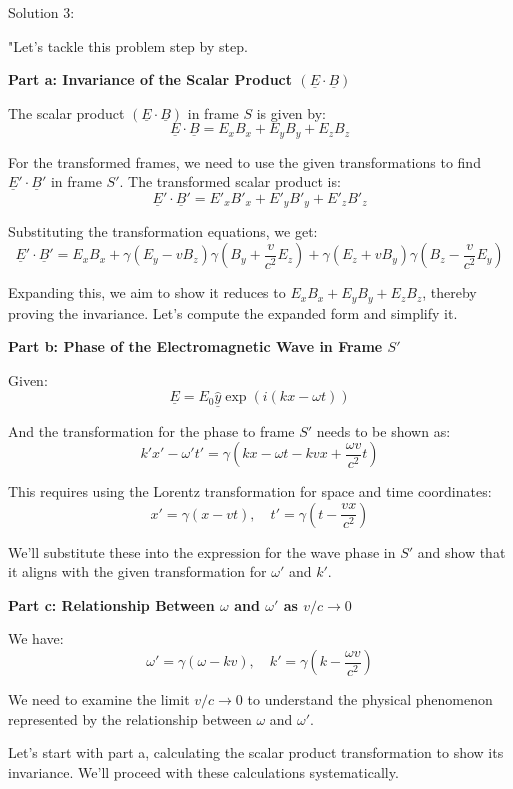 Solution 3:

"Let's tackle this problem step by step.

\textbf{Part a: Invariance of the Scalar Product \( (\underline{E} \cdot \underline{B}) \)}

The scalar product \( (\underline{E} \cdot \underline{B}) \) in frame \( S \) is given by:
\[
\underline{E} \cdot \underline{B} = E_{x}B_{x} + E_{y}B_{y} + E_{z}B_{z}
\]

For the transformed frames, we need to use the given transformations to find \( \underline{E}' \cdot \underline{B}' \) in frame \( S' \). The transformed scalar product is:
\[
\underline{E}' \cdot \underline{B}' = E'_{x}B'_{x} + E'_{y}B'_{y} + E'_{z}B'_{z}
\]

Substituting the transformation equations, we get:
\[
\underline{E}' \cdot \underline{B}' = E_{x}B_{x} + \gamma(E_{y} - vB_{z})\gamma(B_{y} + \frac{v}{c^{2}}E_{z}) + \gamma(E_{z} + vB_{y})\gamma(B_{z} - \frac{v}{c^{2}}E_{y})
\]

Expanding this, we aim to show it reduces to \( E_{x}B_{x} + E_{y}B_{y} + E_{z}B_{z} \), thereby proving the invariance. Let's compute the expanded form and simplify it.

\textbf{Part b: Phase of the Electromagnetic Wave in Frame \( S' \)}

Given:
\[
\underline{E} = E_{0} \hat{\underline{y}} \exp(i(kx - \omega t))
\]

And the transformation for the phase to frame \( S' \) needs to be shown as:
\[
k'x' - \omega' t' = \gamma(kx - \omega t - kvx + \frac{\omega v}{c^{2}} t)
\]

This requires using the Lorentz transformation for space and time coordinates:
\[
x' = \gamma(x - vt), \quad t' = \gamma\left(t - \frac{vx}{c^{2}}\right)
\]

We'll substitute these into the expression for the wave phase in \( S' \) and show that it aligns with the given transformation for \( \omega' \) and \( k' \).

\textbf{Part c: Relationship Between \( \omega \) and \( \omega' \) as \( v/c \rightarrow 0 \)}

We have:
\[
\omega' = \gamma(\omega - kv), \quad k' = \gamma(k - \frac{\omega v}{c^{2}})
\]

We need to examine the limit \( v/c \rightarrow 0 \) to understand the physical phenomenon represented by the relationship between \( \omega \) and \( \omega' \).

Let's start with part a, calculating the scalar product transformation to show its invariance. We'll proceed with these calculations systematically.

